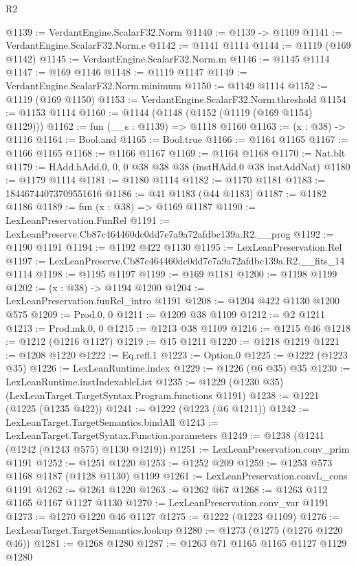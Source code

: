 \begin{lexlean}{R2}
\begin{coremodule}
@1139 := VerdantEngine.ScalarF32.Norm
@1140 := @1139 -> @1109
@1141 := VerdantEngine.ScalarF32.Norm.e
@1142 := @1141 @1114
@1144 := @1119 (@169 @1142)
@1145 := VerdantEngine.ScalarF32.Norm.m
@1146 := @1145 @1114
@1147 := @169 @1146
@1148 := @1119 @1147
@1149 := VerdantEngine.ScalarF32.Norm.minimum
@1150 := @1149 @1114
@1152 := @1119 (@169 @1150)
@1153 := VerdantEngine.ScalarF32.Norm.threshold
@1154 := @1153 @1114
@1160 := @1144 (@1148 (@1152 (@1119 (@169 @1154) @1129)))
@1162 := fun (__s : @1139) => @1118 @1160
@1163 := (x : @38) -> @1116
@1164 := Bool.and
@1165 := Bool.true
@1166 := @1164 @1165
@1167 := @1166 @1165
@1168 := @1166 @1167
@1169 := @1164 @1168
@1170 := Nat.blt
@1179 := HAdd.hAdd.{0, 0, 0} @38 @38 @38 (instHAdd.{0} @38 instAddNat)
@1180 := @1179 @1114
@1181 := @1180 @1114
@1182 := @1170 @1181
@1183 := 18446744073709551616
@1186 := @41 @1183 (@44 @1183)
@1187 := @1182 @1186
@1189 := fun (x : @38) => @1169 @1187
@1190 := LexLeanPreservation.FunRel
@1191 := LexLeanPreserve.Cb87c464460dc0dd7e7a9a72afdbc139a.R2.__prog
@1192 := @1190 @1191
@1194 := @1192 @422 @1130
@1195 := LexLeanPreservation.Rel
@1197 := LexLeanPreserve.Cb87c464460dc0dd7e7a9a72afdbc139a.R2.__fits_14 @1114
@1198 := @1195 @1197
@1199 := @169 @1181
@1200 := @1198 @1199
@1202 := (x : @38) -> @1194 @1200
@1204 := LexLeanPreservation.funRel_intro @1191
@1208 := @1204 @422 @1130 @1200 @575
@1209 := Prod.{0, 0}
@1211 := @1209 @38 @1109
@1212 := @2 @1211
@1213 := Prod.mk.{0, 0}
@1215 := @1213 @38 @1109
@1216 := @1215 @46
@1218 := @1212 (@1216 @1127)
@1219 := @15 @1211
@1220 := @1218 @1219
@1221 := @1208 @1220
@1222 := Eq.refl.{1}
@1223 := Option.{0}
@1225 := @1222 (@1223 @35)
@1226 := LexLeanRuntime.index
@1229 := @1226 (@6 @35) @35
@1230 := LexLeanRuntime.instIndexableList
@1235 := @1229 (@1230 @35) (LexLeanTarget.TargetSyntax.Program.functions @1191)
@1238 := @1221 (@1225 (@1235 @422))
@1241 := @1222 (@1223 (@6 @1211))
@1242 := LexLeanTarget.TargetSemantics.bindAll
@1243 := LexLeanTarget.TargetSyntax.Function.parameters
@1249 := @1238 (@1241 (@1242 (@1243 @575) @1130 @1219))
@1251 := LexLeanPreservation.conv_prim @1191
@1252 := @1251 @1220
@1253 := @1252 @209
@1259 := @1253 @573 @1168 @1187 (@1128 @1130) @1199
@1261 := LexLeanPreservation.convL_cons @1191
@1262 := @1261 @1220
@1263 := @1262 @67
@1268 := @1263 @112 @1165 @1167 @1127 @1130
@1270 := LexLeanPreservation.conv_var @1191
@1273 := @1270 @1220 @46 @1127
@1275 := @1222 (@1223 @1109)
@1276 := LexLeanTarget.TargetSemantics.lookup
@1280 := @1273 (@1275 (@1276 @1220 @46))
@1281 := @1268 @1280
@1287 := @1263 @71 @1165 @1165 @1127 @1129 @1280

\end{coremodule}
\end{lexlean}

